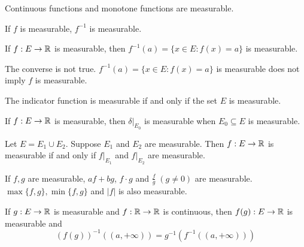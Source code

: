 \documentclass[class=book, crop=false]{standalone}
\begin{document}
        \begin{theorem}
            Continuous functions and monotone functions are measurable.
        \end{theorem}
        \begin{corollary}
            If $f$ is measurable, $f^{-1}$ is measurable.
        \end{corollary}
        \begin{corollary}
            If $f : E \rightarrow \mathbb{R}$ is measurable, then $f^{-1}(a) = \{x \in E : f(x) = a\}$ is measurable.
        \end{corollary}
        \begin{remark}
            The converse is not true. $f^{-1}(a) = \{x \in E : f(x) = a\}$ is measurable does not imply $f$ is measurable.
        \end{remark}

        \begin{theorem}
            The indicator function is measurable if and only if the set $E$ is measurable.
        \end{theorem}

        \begin{theorem}
            If $f : E \rightarrow \mathbb{R}$ is measurable, then $\delta|_{E_0}$ is measurable when $E_0 \subseteq E$ is measurable.
        \end{theorem}

        \begin{theorem}
            Let $E = E_1 \cup E_2$. Suppose $E_1$ and $E_2$ are measurable. Then $f : E \rightarrow \mathbb{R}$ is measurable if and only if $f|_{E_1}$ and $f|_{E_2}$ are measurable.
        \end{theorem}

        \begin{theorem}
            If $f, g$ are measurable, $af + bg$, $f \cdot g$ and $\frac{f}{g} \; (g \neq 0)$ are measurable. $\max\{f, g\}, \min\{f, g\}$ and $|f|$ is also measurable.
        \end{theorem}

        \begin{theorem}
            If $g : E \rightarrow \mathbb{R}$ is measurable and $f : \mathbb{R} \rightarrow \mathbb{R}$ is continuous, then $f(g) : E \rightarrow \mathbb{R}$ is measurable and
            \begin{equation*}
                (f(g))^{-1}((a, +\infty)) = g^{-1}(f^{-1}((a, +\infty)))
            \end{equation*}
        \end{theorem}
\end{document}
